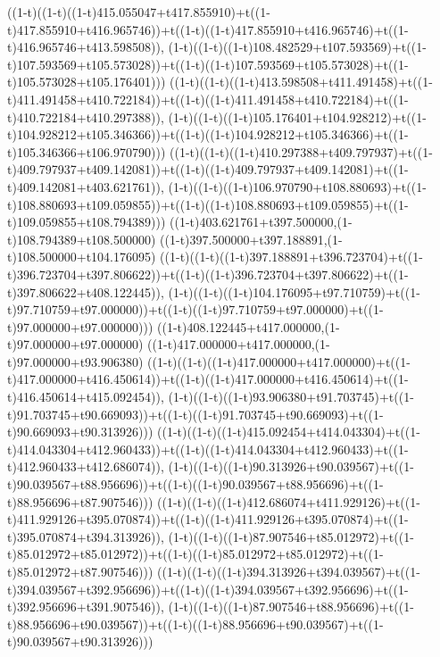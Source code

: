 ((1-t)((1-t)((1-t)415.055047+t417.855910)+t((1-t)417.855910+t416.965746))+t((1-t)((1-t)417.855910+t416.965746)+t((1-t)416.965746+t413.598508)),                                     (1-t)((1-t)((1-t)108.482529+t107.593569)+t((1-t)107.593569+t105.573028))+t((1-t)((1-t)107.593569+t105.573028)+t((1-t)105.573028+t105.176401)))
((1-t)((1-t)((1-t)413.598508+t411.491458)+t((1-t)411.491458+t410.722184))+t((1-t)((1-t)411.491458+t410.722184)+t((1-t)410.722184+t410.297388)),                                     (1-t)((1-t)((1-t)105.176401+t104.928212)+t((1-t)104.928212+t105.346366))+t((1-t)((1-t)104.928212+t105.346366)+t((1-t)105.346366+t106.970790)))
((1-t)((1-t)((1-t)410.297388+t409.797937)+t((1-t)409.797937+t409.142081))+t((1-t)((1-t)409.797937+t409.142081)+t((1-t)409.142081+t403.621761)),                                     (1-t)((1-t)((1-t)106.970790+t108.880693)+t((1-t)108.880693+t109.059855))+t((1-t)((1-t)108.880693+t109.059855)+t((1-t)109.059855+t108.794389)))
((1-t)403.621761+t397.500000,(1-t)108.794389+t108.500000)
((1-t)397.500000+t397.188891,(1-t)108.500000+t104.176095)
((1-t)((1-t)((1-t)397.188891+t396.723704)+t((1-t)396.723704+t397.806622))+t((1-t)((1-t)396.723704+t397.806622)+t((1-t)397.806622+t408.122445)),                                     (1-t)((1-t)((1-t)104.176095+t97.710759)+t((1-t)97.710759+t97.000000))+t((1-t)((1-t)97.710759+t97.000000)+t((1-t)97.000000+t97.000000)))
((1-t)408.122445+t417.000000,(1-t)97.000000+t97.000000)
((1-t)417.000000+t417.000000,(1-t)97.000000+t93.906380)
((1-t)((1-t)((1-t)417.000000+t417.000000)+t((1-t)417.000000+t416.450614))+t((1-t)((1-t)417.000000+t416.450614)+t((1-t)416.450614+t415.092454)),                                     (1-t)((1-t)((1-t)93.906380+t91.703745)+t((1-t)91.703745+t90.669093))+t((1-t)((1-t)91.703745+t90.669093)+t((1-t)90.669093+t90.313926)))
((1-t)((1-t)((1-t)415.092454+t414.043304)+t((1-t)414.043304+t412.960433))+t((1-t)((1-t)414.043304+t412.960433)+t((1-t)412.960433+t412.686074)),                                     (1-t)((1-t)((1-t)90.313926+t90.039567)+t((1-t)90.039567+t88.956696))+t((1-t)((1-t)90.039567+t88.956696)+t((1-t)88.956696+t87.907546)))
((1-t)((1-t)((1-t)412.686074+t411.929126)+t((1-t)411.929126+t395.070874))+t((1-t)((1-t)411.929126+t395.070874)+t((1-t)395.070874+t394.313926)),                                     (1-t)((1-t)((1-t)87.907546+t85.012972)+t((1-t)85.012972+t85.012972))+t((1-t)((1-t)85.012972+t85.012972)+t((1-t)85.012972+t87.907546)))
((1-t)((1-t)((1-t)394.313926+t394.039567)+t((1-t)394.039567+t392.956696))+t((1-t)((1-t)394.039567+t392.956696)+t((1-t)392.956696+t391.907546)),                                     (1-t)((1-t)((1-t)87.907546+t88.956696)+t((1-t)88.956696+t90.039567))+t((1-t)((1-t)88.956696+t90.039567)+t((1-t)90.039567+t90.313926)))
